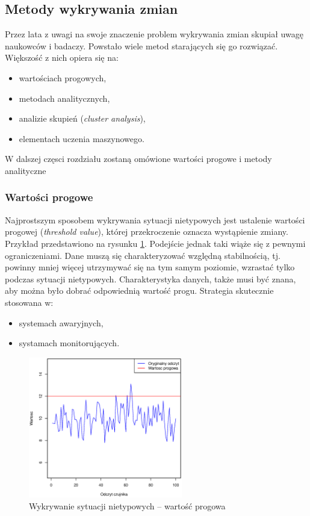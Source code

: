 
\subsection{Metody wykrywania zmian}

Przez lata z uwagi na swoje znaczenie problem wykrywania zmian skupiał uwagę naukowców i badaczy.
Powstało wiele metod starających się go rozwiązać.
Większość z nich opiera się na:
\begin{itemize}
  \item wartościach progowych,
  \item metodach analitycznych,
  \item analizie skupień (\textit{cluster analysis}),
  \item elementach uczenia maszynowego.
\end{itemize}
W dalszej częsci rozdziału zostaną omówione wartości progowe i metody analityczne
\subsubsection{Wartości progowe}
Najprostszym sposobem wykrywania sytuacji nietypowych jest ustalenie wartości progowej (\textit{threshold value}),
której przekroczenie oznacza wystąpienie zmiany.
Przykład przedstawiono na rysunku \ref{fig:SignalThreshold}.
Podejście jednak taki wiąże się z pewnymi ograniczeniami.
Dane muszą się charakteryzować względną stabilnością,
tj. powinny mniej więcej utrzymywać się na tym samym poziomie, wzrastać tylko podczas sytuacji nietypowych.
Charakterystyka danych,
także musi być znana,
aby można było dobrać odpowiednią wartość progu.
Strategia skutecznie stosowana w:
\begin{itemize}
  \item systemach awaryjnych,
  \item systamach monitorujących.
\end{itemize}
\begin{figure}[htbp]
\centering
	\includegraphics[width=0.6\textwidth]{img/ch-2-threshold}
	\caption{Wykrywanie sytuacji nietypowych -- wartość progowa}
  \label{fig:SignalThreshold}
\end{figure}

